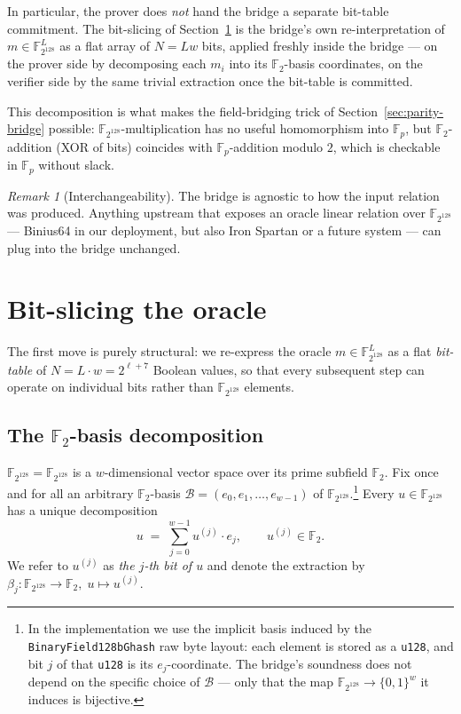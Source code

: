 \documentclass[11pt,a4paper]{article}
\theoremstyle{definition}
\theoremstyle{remark}
\newtheorem{remark}[theorem]{Remark}
\newcommand{\binF}{\mathbb{F}_{2^{128}}}        %
\newcommand{\akF}{\mathbb{F}_{p}}                %
\newcommand{\GF}[1]{\mathbb{F}_{#1}}             %
\newcommand{\Message}{m}                          %
\newcommand{\bits}{\{0,1\}}
\begin{document}
In particular, the prover does \emph{not} hand the bridge a separate
bit-table commitment. The bit-slicing of Section~\ref{sec:bit-slicing}
is the bridge's own re-interpretation of $\Message \in \binF^L$ as a
flat array of $N = L w$ bits, applied freshly inside the bridge — on
the prover side by decomposing each $\Message_i$ into its
$\GF{2}$-basis coordinates, on the verifier side by the same trivial
extraction once the bit-table is committed.

This decomposition is what makes the field-bridging trick of
Section~\ref{sec:parity-bridge} possible: $\binF$-multiplication has no
useful homomorphism into $\akF$, but $\GF{2}$-addition (XOR of bits)
coincides with $\akF$-addition modulo $2$, which is checkable in $\akF$
without slack.

\begin{remark}[Interchangeability]
The bridge is agnostic to how the input relation was produced. Anything
upstream that exposes an oracle linear relation over $\binF$ — Binius64
in our deployment, but also Iron Spartan or a future system — can plug
into the bridge unchanged.
\end{remark}


\section{Bit-slicing the oracle}
\label{sec:bit-slicing}

The first move is purely structural: we re-express the oracle
$\Message \in \binF^L$ as a flat \emph{bit-table} of $N = L \cdot w
= 2^{\ell + 7}$ Boolean values, so that every subsequent step can
operate on individual bits rather than $\binF$ elements.

\subsection{The \texorpdfstring{$\GF{2}$}{F\_2}-basis decomposition}

$\binF = \GF{2^{128}}$ is a $w$-dimensional vector space over its prime
subfield $\GF{2}$. Fix once and for all an arbitrary $\GF{2}$-basis
$\mathcal{B} = (e_0, e_1, \ldots, e_{w-1})$ of $\binF$.\footnote{In the
implementation we use the implicit basis induced by the
\texttt{BinaryField128bGhash} raw byte layout: each element is stored
as a \texttt{u128}, and bit $j$ of that \texttt{u128} is its
$e_j$-coordinate. The bridge's soundness does not depend on the
specific choice of $\mathcal{B}$ — only that the map
$\binF \to \bits^{w}$ it induces is bijective.} Every $u \in \binF$
has a unique decomposition
\[
  u \;=\; \sum_{j=0}^{w-1} u^{(j)} \cdot e_j,
  \qquad u^{(j)} \in \GF{2}.
\]
We refer to $u^{(j)}$ as \emph{the $j$-th bit of $u$} and denote the
extraction by $\beta_j : \binF \to \GF{2},\; u \mapsto u^{(j)}$.
\end{document}
